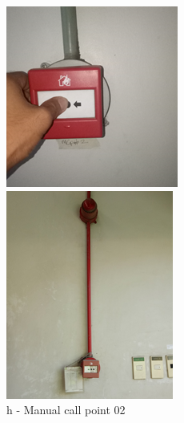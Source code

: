 \begin{figure}[h]
\begin{minipage}[b]{0.22\linewidth}
	\includegraphics[width=\textwidth]{figures/ch05_fdas_mcp02}
	\caption*{h - Manual call point 02}
\end{minipage}
	\hspace{0.03cm}
\begin{minipage}[b]{0.22\linewidth}
	\centering
	\includegraphics[width=\textwidth]{figures/ch05_fdas_buzzer01}

\end{minipage}
\end{figure}
